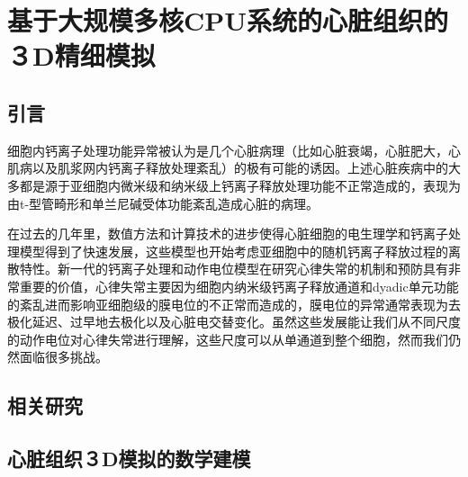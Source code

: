 \chapter{基于大规模多核CPU系统的心脏组织的３D精细模拟}
\label{ICA3PP}

\section{引言}
细胞内钙离子处理功能异常被认为是几个心脏病理（比如心脏衰竭，心脏肥大，心肌病以及肌浆网内钙离子释放处理紊乱）的极有可能的诱因。上述心脏疾病中的大多都是源于亚细胞内微米级和纳米级上钙离子释放处理功能不正常造成的，表现为由t-型管畸形和单兰尼碱受体功能紊乱造成心脏的病理。

在过去的几年里，数值方法和计算技术的进步使得心脏细胞的电生理学和钙离子处理模型得到了快速发展，这些模型也开始考虑亚细胞中的随机钙离子释放过程的离散特性。新一代的钙离子处理和动作电位模型在研究心律失常的机制和预防具有非常重要的价值，心律失常主要因为细胞内纳米级钙离子释放通道和dyadic单元功能的紊乱进而影响亚细胞级的膜电位的不正常而造成的，膜电位的异常通常表现为去极化延迟、过早地去极化以及心脏电交替变化。虽然这些发展能让我们从不同尺度的动作电位对心律失常进行理解，这些尺度可以从单通道到整个细胞，然而我们仍然面临很多挑战。



\section{相关研究}


\section{心脏组织３D模拟的数学建模}

